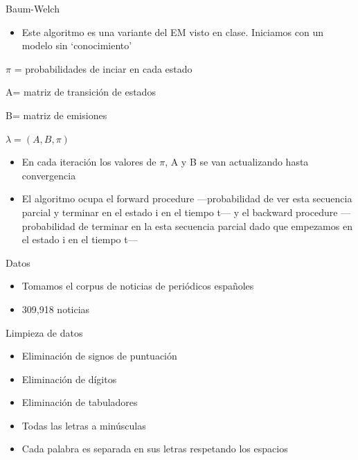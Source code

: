 \documentclass[ignorenonframetext,]{beamer}
\begin{document}
\begin{frame}{Baum-Welch}

\begin{itemize}
\itemsep1pt\parskip0pt
\item
  Este algoritmo es una variante del EM visto en clase. Iniciamos con un
  modelo sin `conocimiento'
\end{itemize}

$\pi$ = probabilidades de inciar en cada estado

A= matriz de transición de estados

B= matriz de emisiones

$\lambda=(A,B,\pi)$

\begin{itemize}
\itemsep1pt\parskip0pt
\item
  En cada iteración los valores de $\pi$, A y B se van actualizando
  hasta convergencia
\item
  El algoritmo ocupa el forward procedure ---probabilidad de ver esta
  secuencia parcial y terminar en el estado i en el tiempo t--- y el
  backward procedure ---probabilidad de terminar en la esta secuencia
  parcial dado que empezamos en el estado i en el tiempo t---
\end{itemize}

\end{frame}

\begin{frame}{Datos}

\begin{itemize}
\itemsep1pt\parskip0pt
\item
  Tomamos el corpus de noticias de periódicos españoles
\item
  309,918 noticias
\end{itemize}

\end{frame}

\begin{frame}{Limpieza de datos}

\begin{itemize}
\itemsep1pt\parskip0pt
\item
  Eliminación de signos de puntuación
\item
  Eliminación de dígitos
\item
  Eliminación de tabuladores
\item
  Todas las letras a minúsculas
\item
  Cada palabra es separada en sus letras respetando los espacios
\end{itemize}

\end{frame}
\end{document}

